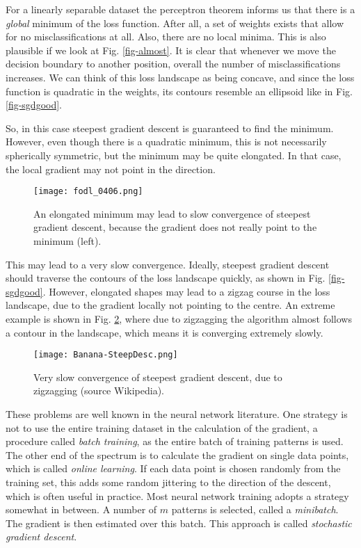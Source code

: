   For a linearly separable dataset the perceptron theorem informs us that there is a \emph{global} minimum of the loss function. After all, a set of weights exists that
  allow for no misclassifications at all. Also, there are no local minima. This is also plausible if we look at Fig. \ref{fig-almost}. It is clear that whenever we
  move the decision boundary to another position, overall the number of misclassifications increases. We can think of this loss landscape as being concave, and since
  the loss function is quadratic in the weights, its contours resemble an ellipsoid like in  Fig. \ref{fig-sgdgood}.


  So, in this case steepest gradient descent is guaranteed to find the minimum. However, even though there is a quadratic minimum, this is not necessarily
  spherically symmetric, but the minimum may be quite elongated. In that case, the local gradient may not point in the direction. 

  \begin{figure}[!ht]
    \begin{center}
    \texttt{[image: fodl\_0406.png]}
    \end{center}
    \caption{An elongated minimum may lead to slow convergence of steepest gradient descent, because the gradient does not really point to the minimum (left).}
    \label{fig-elong}
  \end{figure}

  This may lead to a very slow convergence. Ideally, steepest gradient descent should traverse the contours of the loss landscape quickly, as shown in Fig. \ref{fig-sgdgood}.
  However, elongated shapes may lead to a zigzag course in the loss landscape, due to the gradient locally not pointing to the centre. An extreme example
  is shown in Fig. \ref{fig-bad}, where due to zigzagging the algorithm almost follows a contour in the landscape, which means it is converging extremely slowly.

  \begin{figure}
    \begin{center}
      \texttt{[image: Banana-SteepDesc.png]}
    \end{center}
    \caption{Very slow convergence of steepest gradient descent, due to zigzagging (source Wikipedia).}
    \label{fig-bad}
  \end{figure}


  These problems are well known in the neural network literature. One strategy is not to use the entire training dataset in the calculation of the gradient, a procedure
  called \emph{batch training}, as the entire batch of training patterns is used. The other end of the spectrum is to calculate the gradient
  on single data points, which is called \emph{online learning}. If each data point is chosen randomly from the training set, this adds some random jittering
  to the direction of the descent, which is often useful in practice. Most neural network training adopts a strategy somewhat in  between. A number of $m$ patterns
  is selected, called a \emph{minibatch}. The gradient is then estimated over this batch. This approach is called \emph{stochastic gradient descent}.

